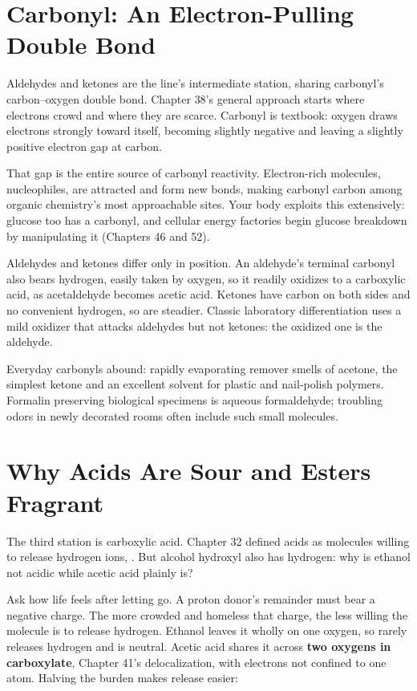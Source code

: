 \section{Carbonyl: An Electron-Pulling Double Bond}

Aldehydes and ketones are the line's intermediate station, sharing carbonyl's carbon--oxygen double bond. Chapter 38's general approach starts where electrons crowd and where they are scarce. Carbonyl is textbook: oxygen draws electrons strongly toward itself, becoming slightly negative and leaving a slightly positive electron gap at carbon.

That gap is the entire source of carbonyl reactivity. Electron-rich molecules, nucleophiles, are attracted and form new bonds, making carbonyl carbon among organic chemistry's most approachable sites. Your body exploits this extensively: glucose too has a carbonyl, and cellular energy factories begin glucose breakdown by manipulating it (Chapters 46 and 52).

Aldehydes and ketones differ only in position. An aldehyde's terminal carbonyl also bears hydrogen, easily taken by oxygen, so it readily oxidizes to a carboxylic acid, as acetaldehyde becomes acetic acid. Ketones have carbon on both sides and no convenient hydrogen, so are steadier. Classic laboratory differentiation uses a mild oxidizer that attacks aldehydes but not ketones: the oxidized one is the aldehyde.

Everyday carbonyls abound: rapidly evaporating remover smells of acetone, the simplest ketone and an excellent solvent for plastic and nail-polish polymers. Formalin preserving biological specimens is aqueous formaldehyde; troubling odors in newly decorated rooms often include such small molecules.

\section{Why Acids Are Sour and Esters Fragrant}

The third station is carboxylic acid. Chapter 32 defined acids as molecules willing to release hydrogen ions, . But alcohol hydroxyl also has hydrogen: why is ethanol not acidic while acetic acid plainly is?

Ask how life feels after letting go. A proton donor's remainder must bear a negative charge. The more crowded and homeless that charge, the less willing the molecule is to release hydrogen. Ethanol leaves it wholly on one oxygen, so rarely releases hydrogen and is neutral. Acetic acid shares it across \textbf{two oxygens in carboxylate}, Chapter 41's delocalization, with electrons not confined to one atom. Halving the burden makes release easier:

